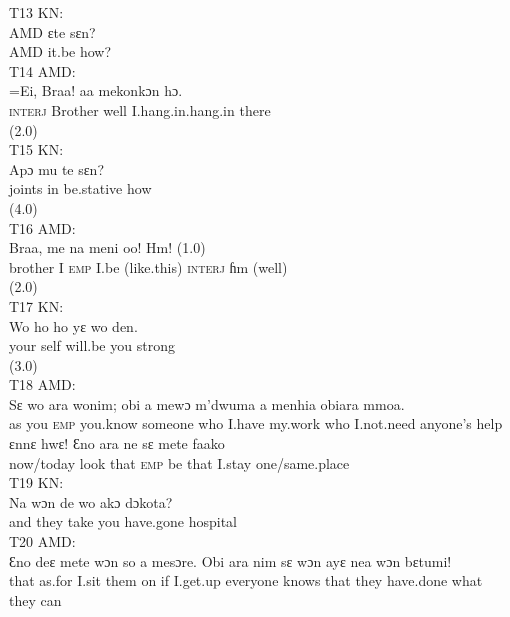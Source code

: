 \documentclass[output=paper,colorlinks,citecolor=brown]{langscibook}
\begin{document}
   \noindent{}
\ea\label{ex:obeng:13}
    T13 KN:\\
    \gll    AMD ɛte sɛn?\\
            AMD it.be how?\\
\ex\label{ex:obeng:14}
    T14 AMD:\\
    \gll    =Ei, Braa! aa mekonkɔn hɔ.\\
            \textsc{interj} Brother well I.hang.in.hang.in there \\
            (2.0)\\
\ex\label{ex:obeng:15}
    T15 KN:\\
    \gll    Apɔ mu te sɛn? \\
            joints in be.stative how\\
            (4.0)\\
\ex\label{ex:obeng:16}
    T16 AMD:\\
    \gll    Braa, me na meni oo! Hm! (1.0)\\
            brother I \textsc{emp} I.be (like.this) \textsc{interj} ɦm (well)\\
            (2.0)\\
\ex\label{ex:obeng:17}
    T17 KN:\\
    \gll    Wo ho ho yɛ wo den.\\
            your self will.be you strong\\
            (3.0)\\
\ex\label{ex:obeng:18}
    T18 AMD:\\
    \ea
    \gll    Sɛ wo ara wonim; obi a mewɔ m’dwuma a menhia obiara mmoa.\\
            as you \textsc{emp} you.know someone who I.have my.work who I.not.need anyone’s help\\
    \ex
    \gll    ɛnnɛ hwɛ! Ɛno ara ne sɛ mete faako \\
            now/today look that \textsc{emp} be that I.stay one/same.place\\
    \z
\ex\label{ex:obeng:19}
    T19 KN:\\
    \gll    Na wɔn de wo akɔ dɔkota?\\
            and they take you have.gone hospital\\
\largerpage[2]
\ex\label{ex:obeng:20}
    T20 AMD:\\
    \gll    Ɛno deɛ mete wɔn so a mesɔre. Obi ara nim sɛ wɔn ayɛ nea wɔn bɛtumi!\\
            that as.for I.sit them on if I.get.up everyone knows that they have.done what they can\\
\end{document}
